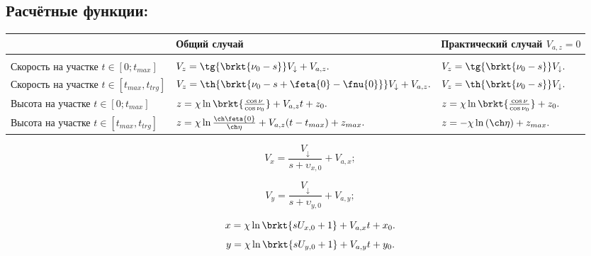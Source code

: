 \subsection{Расчётные функции:}

\begin{tabular}[t]{|l|p{60mm}|p{50mm}|}
\hline
&
Общий случай
&
Практический случай $V_{a,z}=0$
\\ \hline
&
&
\\
Скорость на участке $t \in [0; t_{max}]$ 
& 
$V_z = \tg{ \brkt{ \nu_{0} - s } } V_\downarrow + V_{a,z}.$
&
$V_z = \tg{ \brkt{ \nu_{0} - s } } V_\downarrow.$
\\ 
Скорость на участке $t \in [t_{max}, t_{trg}]$
&
$V_z =  \th {\brkt{ \nu_{0} - s + \feta{0} - \fnu{0}  } } V_\downarrow + V_{a,z}.$
&
$V_z =  \th {\brkt{ \nu_{0} - s  } } V_\downarrow.$
\\ 
Высота на участке $t \in [0; t_{max}]$
&
$z = \chi \ln{ \brkt{  \frac{\cos \nu}{\cos \nu_{0}}  }}  +  V_{a,z}t +  z_0.$
&
$z = \chi \ln{ \brkt{  \frac{\cos \nu}{\cos \nu_{0}}  }}  +  z_0.$

\\ 
Высота на участке $t \in [t_{max}, t_{trg}]$
&
$z = \chi \ln{ \frac{\ch \feta{0}}{\ch \eta} }+  V_{a,z}(t - t_{max})+ z_{max}.$
&
$z = - \chi \ln{(\ch \eta)} + z_{max}.$

\\ \hline
\end{tabular}

$$V_x = \frac{V_\downarrow}{s + \upsilon_{x,0}} + V_{a,x};$$

$$V_y = \frac{V_\downarrow}{s + \upsilon_{y,0}} + V_{a,y};$$

$$x = \chi \ln{\brkt{sU_{x,0} + 1 } } + V_{a,x}t + x_0.$$
$$y = \chi \ln{\brkt{sU_{y,0} + 1 } } + V_{a,y}t + y_0.$$